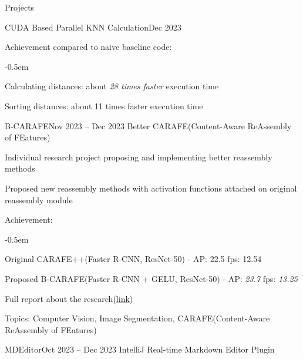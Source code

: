 \documentclass{resume}
\begin{document}
\begin{rSection}{Projects}
\begin{rSubsection}{CUDA Based Parallel KNN Calculation}{Dec 2023}
        \item Achievement compared to naive baseline code:
        \vspace{-0.5em}
        \begin{list}{--}{\setlength{\rightmargin}{1.5em}}
            \itemsep -0.5em

            \item Calculating distances: about \emph{28 times faster} execution time

            \item Sorting distances: about 11 times faster execution time
        \end{list}
    \end{rSubsection}

    \begin{rSubsection}{B-CARAFE}{Nov 2023 -- Dec 2023}
        Better CARAFE(Content-Aware ReAssembly of FEatures)

        \item Individual research project proposing and implementing better reassembly methods

        \item Proposed new reassembly methods with activation functions attached on original reassembly module

        \item Achievement:
        \vspace{-0.5em}
        \begin{list}{--}{\setlength{\rightmargin}{1.5em}}
            \itemsep -0.5em

            \item Original CARAFE++(Faster R-CNN, ResNet-50) - AP: 22.5 fps: 12.54
            
            \item Proposed B-CARAFE(Faster R-CNN + GELU, ResNet-50) - AP: \emph{23.7} fps: \emph{13.25}
        \end{list}

        \item Full report about the research(\href{https://github.com/minsusun/csed539/blob/main/main.pdf}{link})

        \item Topics: Computer Vision, Image Segmentation, CARAFE(Content-Aware ReAssembly of FEatures)
    \end{rSubsection}

    \begin{rSubsection}{MDEditor}{Oct 2023 -- Dec 2023}
        IntelliJ Real-time Markdown Editor Plugin


\end{rSubsection}
\end{rSection}
\end{document}
